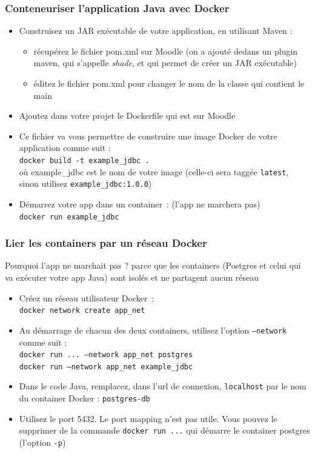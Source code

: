 \documentclass[aspectratio=169,10pt]{beamer}
\begin{document}
\begin{frame}
	\frametitle{Conteneuriser l'application Java avec Docker}
	\begin{itemize}		
		\item Construisez un JAR exécutable de votre application, en utilisant Maven :
		\begin{itemize}
			\item récupérez le fichier pom.xml sur Moodle (on a ajouté dedans un plugin maven, qui s'appelle \textit{shade}, et qui permet de créer un JAR exécutable)
			\item éditez le fichier pom.xml pour changer le nom de la classe qui contient le main
		\end{itemize}
		\item Ajoutez dans votre projet le Dockerfile qui est sur Moodle
		\item Ce fichier va vous permettre de construire une image Docker de votre application comme suit :\\
		\texttt{docker build -t example\_jdbc .}\\
		où example\_jdbc est le nom de votre image (celle-ci sera taggée \texttt{latest}, sinon utilisez \texttt{example\_jdbc:1.0.0})
		\item Démarrez votre app dans un container~: (l'app ne marchera pas)\\
		\texttt{docker run example\_jdbc} 
	\end{itemize}
\end{frame}

\begin{frame}
	\frametitle{Lier les containers par un réseau Docker}
	Pourquoi l'app ne marchait pas ? parce que les containers (Postgres et celui qui va exécuter votre app Java) sont isolés et ne partagent aucun réseau 
	\begin{itemize}		
		\item Créez un réseau utilisateur Docker~:\\
		\texttt{docker network create app\_net}
		\item Au démarrage de chacun des deux containers, utilisez l'option \texttt{---network} comme suit :\\
		\texttt{docker run ... \textcolor{qaaccent2}{---network app\_net} postgres}\\
		\texttt{docker run \textcolor{qaaccent2}{---network app\_net} example\_jdbc}
		\item Dans le code Java, remplacez, dans l'url de connexion, \texttt{localhost} par le nom du container Docker : \texttt{postgres-db}
		\item Utilisez le port 5432. Le port mapping n'est pas utile. Vous pouvez le supprimer de la commande \texttt{docker run ...} qui démarre le container postgres (l'option \texttt{-p})
	\end{itemize}
	
\end{frame}
\end{document}
